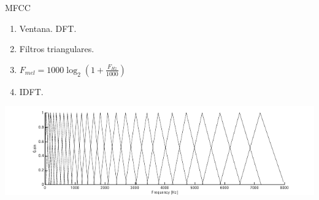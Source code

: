 \documentclass{beamer}
\begin{document}
\begin{frame}{MFCC}

\begin{enumerate}
\item Ventana. DFT.
\item Filtros triangulares.
\item $\displaystyle F_{mel}=1000\log_{2}\left(1+\frac{F_{Hz}}{1000}\right)$
\item IDFT.
\end{enumerate}

\includegraphics[width=\linewidth]{8}

\end{frame}
\end{document}
